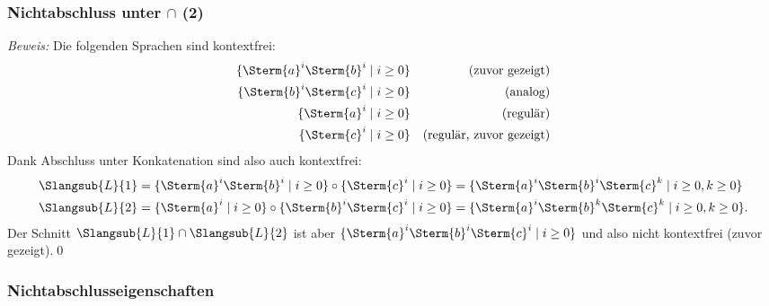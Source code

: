 \documentclass[aspectratio=1610,onlymath]{beamer}
\begin{document}
\begin{frame}\frametitle{Nichtabschluss unter $\cap$ (2)}


\emph{Beweis:} Die folgenden Sprachen sind kontextfrei:
\begin{align*}
\{\Sterm{a}^i\Sterm{b}^i\mid i\geq 0\} && \text{(zuvor gezeigt)}\\
\{\Sterm{b}^i\Sterm{c}^i\mid i\geq 0\} && \text{(analog)}\\
\{\Sterm{a}^i\mid i\geq 0\} && \text{(regulär)}\\
\{\Sterm{c}^i\mid i\geq 0\} && \text{(regulär, zuvor gezeigt)}
\end{align*}\pause
% 
Dank Abschluss unter Konkatenation sind also auch kontextfrei:
\begin{align*}
\Slangsub{L}{1}&=\{\Sterm{a}^i\Sterm{b}^i\mid i\geq 0\}\circ \{\Sterm{c}^i\mid i\geq 0\} = \{\Sterm{a}^i\Sterm{b}^i\Sterm{c}^k\mid i\geq 0, k\geq 0\}\\
\Slangsub{L}{2}&=\{\Sterm{a}^i\mid i\geq 0\}\circ \{\Sterm{b}^i\Sterm{c}^i\mid i\geq 0\} = \{\Sterm{a}^i\Sterm{b}^k\Sterm{c}^k\mid i\geq 0, k\geq 0\}.
\end{align*}\pause
Der Schnitt $\Slangsub{L}{1}\cap\Slangsub{L}{2}$ ist aber $\{\Sterm{a}^i\Sterm{b}^i\Sterm{c}^i\mid i\geq 0\}$ und
also nicht kontextfrei (zuvor gezeigt).\qed


\end{frame}

\begin{frame}\frametitle{Nichtabschlusseigenschaften}


\end{frame}
\end{document}
